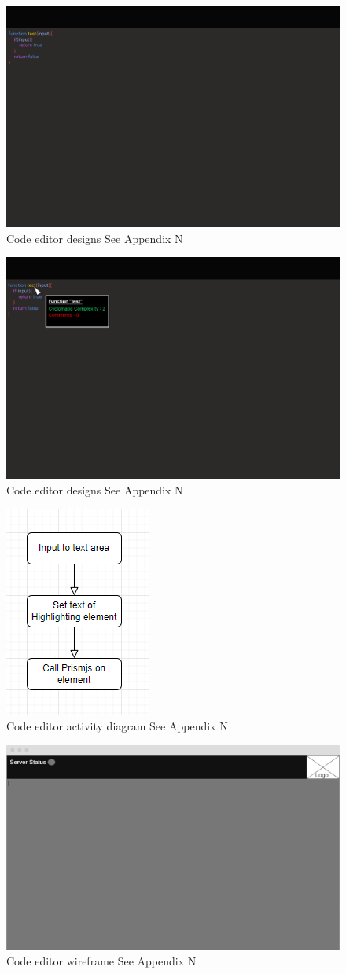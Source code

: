 \begin{figure}
    \includegraphics[width=.4\textwidth]{appendix/N/code-editor4.png}
    \caption{Code editor designs See Appendix N}
    \label{fig:codeeditor4}
\end{figure}
\begin{figure}
    \includegraphics[width=.4\textwidth]{appendix/N/code-editor5.png}
    \caption{Code editor designs See Appendix N}
    \label{fig:codeeditor5}
\end{figure}
\begin{figure}
    \includegraphics[width=.4\textwidth]{appendix/N/code-editor-activity-diagram.png}
    \caption{Code editor activity diagram See Appendix N}
    \label{fig:codeeditor6}
\end{figure}
\begin{figure}
    \includegraphics[width=.4\textwidth]{appendix/N/wireframe1.png}
    \caption{Code editor wireframe See Appendix N}
    \label{fig:codeeditor7}
\end{figure}

